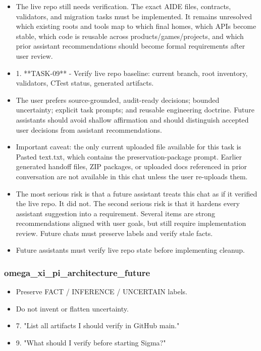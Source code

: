 \documentclass[11pt,a4paper]{report}
\begin{document}
\begin{itemize}
\item The live repo still needs verification. The exact AIDE files, contracts, validators, and migration tasks must be implemented. It remains unresolved which existing roots and tools map to which final homes, which APIs become stable, which code is reusable across products/games/projects, and which prior assistant recommendations should become formal requirements after user review.
\item 1. **TASK-09** - Verify live repo baseline: current branch, root inventory, validators, CTest status, generated artifacts.
\item The user prefers source-grounded, audit-ready decisions; bounded uncertainty; explicit task prompts; and reusable engineering doctrine. Future assistants should avoid shallow affirmation and should distinguish accepted user decisions from assistant recommendations.
\item Important caveat: the only current uploaded file available for this task is Pasted text.txt, which contains the preservation-package prompt. Earlier generated handoff files, ZIP packages, or uploaded docs referenced in prior conversation are not available in this chat unless the user re-uploads them.
\item The most serious risk is that a future assistant treats this chat as if it verified the live repo. It did not. The second serious risk is that it hardens every assistant suggestion into a requirement. Several items are strong recommendations aligned with user goals, but still require implementation review. Future chats must preserve labels and verify stale facts.
\item Future assistants must verify live repo state before implementing cleanup.
\end{itemize}

\subsubsection{omega\_xi\_pi\_architecture\_future}

\begin{itemize}
\item Preserve FACT / INFERENCE / UNCERTAIN labels.
\item Do not invent or flatten uncertainty.
\item 7. "List all artifacts I should verify in GitHub main."
\item 9. "What should I verify before starting Sigma?"
\end{itemize}
\end{document}
